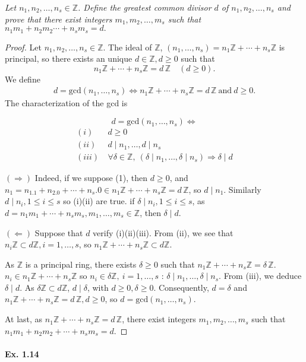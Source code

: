 \documentclass[11pt,a4paper]{article}
\newcommand{\Z}{\mathbb{Z}}
\begin{document}
{{\it Let $n_1,n_2,\ldots,n_s\in \Z$. Define the greatest common divisor $d$ of $n_1,n_2,\ldots,n_s$ and prove that there exist integers $m_1,m_2,\ldots,m_s$ such that $n_1m_1+n_2m_2 \cdots+n_sm_s = d.$
}

\begin{proof}
Let $n_1,n_2,\ldots,n_s\in \Z$. The ideal of $\Z$, $(n_1,\ldots,n_s) = n_1\Z+\cdots+n_s\Z$ is principal, so there exists an unique $d\in \Z, d\geq 0$ such that
$$n_1\Z+\cdots+n_s\Z = d\, \Z\quad (d\geq 0).$$
We define
\begin{align}
d = \mathrm{gcd}(n_1,\ldots,n_s)  \iff n_1\Z+\cdots+n_s\Z = d\, \Z \ \mathrm{and}\ d\geq 0.
\end{align}
The characterization of the gcd is

$$d = \mathrm{gcd}(n_1,\ldots,n_s)  \iff$$
\begin{align}
(i) &\ d \geq 0\\
(ii)&\ d\mid n_1,\ldots, d \mid n_s\\
(iii)&\  \forall \delta \in \Z,\ (\delta \mid n_1,\ldots,\delta \mid n_s) \Rightarrow \delta \mid d
\end{align}

$(\Rightarrow)$ Indeed, if we suppose (1), then $d\geq 0$, and $n_1 = n_1.1 + n_2.0 + \cdots+n_s.0 \in n_1\Z+\cdots+n_s\Z = d\, \Z$, so $d\mid n_1$. Similarly $d\mid n_i, 1\leq i \leq s$ so (i)(ii) are true. if $\delta \mid n_i, 1 \leq i \leq s$, as $d = n_1m_1+\cdots+n_sm_s, m_1,\ldots,m_s \in \Z$, then $\delta \mid d$.

$(\Leftarrow)$ Suppose that $d$ verify (i)(ii)(iii). From (ii), we see that $n_i \Z \subset d \Z, i= 1,\ldots,s$, so $n_1\Z+\cdots+n_s \Z \subset d\Z$.

As $\Z$ is a principal ring, there exists $\delta\geq 0$ such that $n_1\Z+\cdots+n_s\Z = \delta\, \Z$. $n_i \in n_1\Z+\cdots+n_s\Z$ so $n_i \in \delta \Z, \ i=1,\ldots,s$ : $\delta \mid n_1,\ldots, \delta \mid n_s$. From (iii), we deduce $\delta \mid d$. As $\delta \Z \subset d\Z$, $d \mid \delta$, with $d\geq 0, \delta \geq 0$. Consequently, $d = \delta$ and  $n_1\Z+\cdots+n_s\Z =d\, \Z, d\geq 0$, so $d =\mathrm{gcd}(n_1,\ldots,n_s) $.

At last, as $n_1\Z+\cdots+n_s\Z = d\, \Z$, there exist integers  $m_1,m_2,\ldots,m_s$ such that $n_1m_1+n_2m_2+\cdots+n_sm_s = d$.
\end{proof}

\paragraph{Ex. 1.14} 

}
\end{document}
